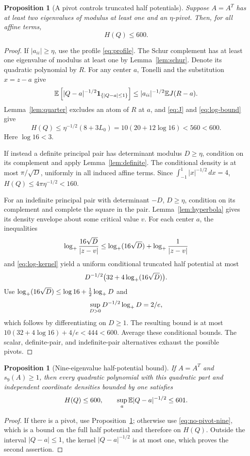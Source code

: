 \documentclass[11pt]{article}
\numberwithin{equation}{section}
\newtheorem{proposition}[theorem]{Proposition}
\theoremstyle{definition}\newtheorem{definition}[theorem]{Definition}
\theoremstyle{remark}\newtheorem{remark}[theorem]{Remark}
\newcommand{\1}{\mathbf 1}\newcommand{\diag}{\operatorname{diag}}
\begin{document}
\begin{proposition}[A pivot controls truncated half potentials]\label{prop:pivot-H}
Suppose $A=A^T$ has at least two eigenvalues of modulus at least one and an $\eta$-pivot. Then, for all affine terms,
\begin{equation}\label{eq:pivot-H}
 H(Q)\le600.
\end{equation}
\end{proposition}
\begin{proof}
If $|a_{ii}|\ge\eta$, use the profile \eqref{eq:profile}. The Schur complement has at least one eigenvalue of modulus at least one by Lemma~\ref{lem:schur}. Denote its quadratic polynomial by $R$. For any center $a$, Tonelli and the substitution $x=z-a$ give
\[
 \E\left[|Q-a|^{-1/2}\1_{\{|Q-a|\le1\}}\right]
 \le |a_{ii}|^{-1/2}\E J(R-a).
\]
Lemma~\ref{lem:quarter} excludes an atom of $R$ at $a$, and \eqref{eq:J} and \eqref{eq:log-bound} give
\[
 H(Q)\le\eta^{-1/2}(8+3L_0)
 =10(20+12\log16)<560<600.
\]
Here $\log16<3$.

If instead a definite principal pair has determinant modulus $D\ge\eta$, condition on its complement and apply Lemma~\ref{lem:definite}. The conditional density is at most $\pi/\sqrt D$, uniformly in all induced affine terms. Since $\int_{-1}^1|x|^{-1/2}\,dx=4$,
$H(Q)\le4\pi\eta^{-1/2}<160$.

For an indefinite principal pair with determinant $-D$, $D\ge\eta$, condition on its complement and complete the square in the pair. Lemma~\ref{lem:hyperbola} gives its density envelope about some critical value $v$. For each center $a$, the inequalities
\[
 \log_+\frac{16\sqrt D}{|z-v|}
 \le\log_+(16\sqrt D)+\log_+\frac1{|z-v|}
\]
and \eqref{eq:log-kernel} yield a uniform conditional truncated half potential at most
\[
 D^{-1/2}\bigl(32+4\log_+(16\sqrt D)\bigr).
\]
Use $\log_+(16\sqrt D)\le\log16+\tfrac12\log_+ D$ and
\begin{equation}\label{eq:scalar-max}
 \sup_{D>0}D^{-1/2}\log_+ D=2/e,
\end{equation}
which follows by differentiating on $D\ge1$. The resulting bound is at most
$10(32+4\log16)+4/e<444<600$.
Average these conditional bounds. The scalar, definite-pair, and indefinite-pair alternatives exhaust the possible pivots.
\end{proof}

\begin{proposition}[Nine-eigenvalue half-potential bound]\label{prop:nine}
If $A=A^T$ and $s_9(A)\ge1$, then every quadratic polynomial with this quadratic part and independent coordinate densities bounded by one satisfies
\begin{equation}\label{eq:nine-H}
 H(Q)\le600,\qquad \sup_a\mathbb E|Q-a|^{-1/2}\le601.
\end{equation}
\end{proposition}
\begin{proof}
If there is a pivot, use Proposition~\ref{prop:pivot-H}; otherwise use \eqref{eq:no-pivot-nine}, which is a bound on the full half potential and therefore on $H(Q)$. Outside the interval $|Q-a|\le1$, the kernel $|Q-a|^{-1/2}$ is at most one, which proves the second assertion.
\end{proof}
\end{document}
